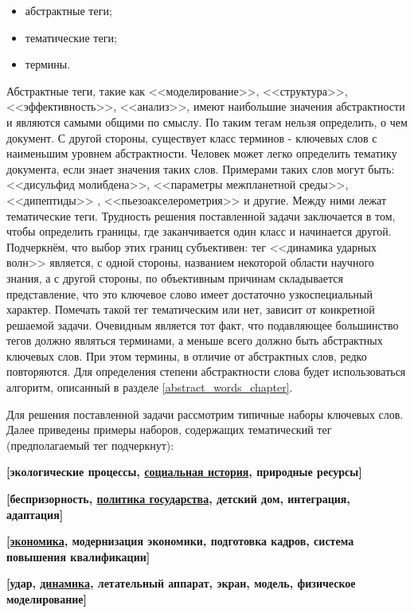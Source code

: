 \begin{itemize}
    \item абстрактные теги;
    \item тематические теги;
    \item термины.
\end{itemize}

Абстрактные теги, такие как <<моделирование>>, <<структура>>, <<эффективность>>, <<анализ>>, имеют наибольшие значения абстрактности и являются самыми общими по смыслу. По таким тегам нельзя определить, о чем документ. С другой стороны, существует класс терминов - ключевых слов с наименьшим уровнем абстрактности. Человек может легко определить тематику документа, если знает значения таких слов. Примерами таких слов могут быть: <<дисульфид молибдена>>, <<параметры межпланетной среды>>, <<дипептиды>> , <<пьезоакселерометрия>> и другие.  Между ними лежат тематические теги. Трудность решения поставленной задачи заключается в том, чтобы определить границы, где заканчивается один класс и начинается другой. Подчеркнём, что выбор этих границ субъективен: тег <<динамика ударных волн>> является, с одной стороны, названием некоторой области научного знания, а с другой стороны, по объективным причинам складывается представление, что это ключевое слово имеет достаточно узкоспециальный характер. Помечать такой тег тематическим или нет, зависит от конкретной решаемой задачи.  Очевидным является тот факт, что подавляющее большинство тегов должно являться терминами, а меньше всего должно быть абстрактных ключевых слов. При этом термины, в отличие от абстрактных слов, редко повторяются. Для определения степени абстрактности слова будет
использоваться алгоритм, описанный в разделе \ref{abstract_words_chapter}.

Для решения поставленной задачи рассмотрим типичные наборы ключевых слов. Далее приведены примеры наборов, содержащих тематический тег (предполагаемый тег подчеркнут):

\textbf{[экологические процессы, \underline{социальная история}, природные ресурсы]}\

\textbf{[беспризорность, \underline{политика государства}, детский дом, интеграция, адаптация]}\

\textbf{[\underline{экономика}, модернизация экономики, подготовка кадров, система повышения
квалификации]}\

\textbf{[удар, \underline{динамика}, летательный аппарат, экран, модель, физическое моделирование]}\

